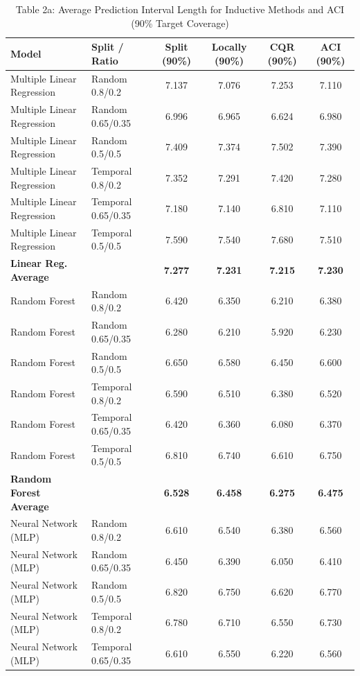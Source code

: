 \documentclass[11pt,a4paper]{article}
\begin{document}
\begin{table}[H]
\centering
\caption{Table 2a: Average Prediction Interval Length for Inductive Methods and ACI (90\% Target Coverage)}
\label{tab:2a}
\scriptsize
\begin{tabular}{llcccc}
\toprule
Model & Split / Ratio & Split (90\%) & Locally (90\%) & CQR (90\%) & ACI (90\%) \\
\midrule
Multiple Linear Regression & Random 0.8/0.2 & 7.137 & 7.076 & 7.253 & 7.110 \\
Multiple Linear Regression & Random 0.65/0.35 & 6.996 & 6.965 & 6.624 & 6.980 \\
Multiple Linear Regression & Random 0.5/0.5 & 7.409 & 7.374 & 7.502 & 7.390 \\
Multiple Linear Regression & Temporal 0.8/0.2 & 7.352 & 7.291 & 7.420 & 7.280 \\
Multiple Linear Regression & Temporal 0.65/0.35 & 7.180 & 7.140 & 6.810 & 7.110 \\
Multiple Linear Regression & Temporal 0.5/0.5 & 7.590 & 7.540 & 7.680 & 7.510 \\
\textbf{Linear Reg. Average} & & \textbf{7.277} & \textbf{7.231} & \textbf{7.215} & \textbf{7.230} \\
\midrule
Random Forest & Random 0.8/0.2 & 6.420 & 6.350 & 6.210 & 6.380 \\
Random Forest & Random 0.65/0.35 & 6.280 & 6.210 & 5.920 & 6.230 \\
Random Forest & Random 0.5/0.5 & 6.650 & 6.580 & 6.450 & 6.600 \\
Random Forest & Temporal 0.8/0.2 & 6.590 & 6.510 & 6.380 & 6.520 \\
Random Forest & Temporal 0.65/0.35 & 6.420 & 6.360 & 6.080 & 6.370 \\
Random Forest & Temporal 0.5/0.5 & 6.810 & 6.740 & 6.610 & 6.750 \\
\textbf{Random Forest Average} & & \textbf{6.528} & \textbf{6.458} & \textbf{6.275} & \textbf{6.475} \\
\midrule
Neural Network (MLP) & Random 0.8/0.2 & 6.610 & 6.540 & 6.380 & 6.560 \\
Neural Network (MLP) & Random 0.65/0.35 & 6.450 & 6.390 & 6.050 & 6.410 \\
Neural Network (MLP) & Random 0.5/0.5 & 6.820 & 6.750 & 6.620 & 6.770 \\
Neural Network (MLP) & Temporal 0.8/0.2 & 6.780 & 6.710 & 6.550 & 6.730 \\
Neural Network (MLP) & Temporal 0.65/0.35 & 6.610 & 6.550 & 6.220 & 6.560 \\

\end{tabular}
\end{table}
\end{document}
